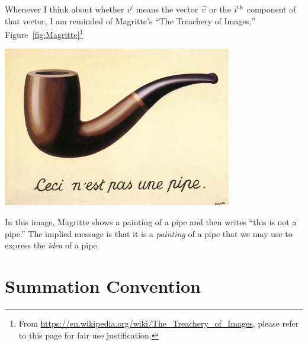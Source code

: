 Whenever I think about whether $v^i$ means the vector $\vec{v}$ or the $i^\textnormal{th}$ component of that vector, I am reminded of Magritte's ``The Treachery of Images,'' Figure~\ref{fig:Magritte}\footnote{From \url{https://en.wikipedia.org/wiki/The_Treachery_of_Images}, please refer to this page for fair use justification.}
\begin{marginfigure}%
    \includegraphics[width=.8\textwidth]{figures/MagrittePipe.jpg}
    \caption{``La Trahison des Images'' (``The Treachery of Images'') by Ren\'e Magritte. Owned by , reproduced here under fair use.}
    \label{fig:Magritte}
\end{marginfigure}
In this image, Magritte shows a painting of a pipe and then writes ``this is not a pipe.'' The implied message is that it is a \emph{painting} of a pipe that we may use to express the \emph{idea} of a pipe.


\section{Summation Convention}
\label{sec:summation}


